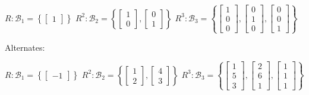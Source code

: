 \documentclass[10pt,letterpaper,final]{report}
\begin{document}
$R: \mathcal{B}_1 = \left\{\begin{bmatrix}
    1
  \end{bmatrix}\right\}$
\medskip
$R^2: \mathcal{B}_2 = \left\{\begin{bmatrix}
    1 \\
    0
  \end{bmatrix}, \begin{bmatrix}
    0 \\
    1
  \end{bmatrix}\right\}$
\medskip
$R^3: \mathcal{B}_3 = \left\{\begin{bmatrix}
    1 \\
    0 \\
    0
  \end{bmatrix}, \begin{bmatrix}
    0 \\
    1 \\
    0
  \end{bmatrix},\begin{bmatrix}
    0 \\
    0 \\
    1
  \end{bmatrix}\right\}$

Alternates:

$R: \mathcal{B}_1 = \left\{\begin{bmatrix}
    -1
  \end{bmatrix}\right\}$
\medskip
$R^2: \mathcal{B}_2 = \left\{\begin{bmatrix}
    1 \\
    2
  \end{bmatrix}, \begin{bmatrix}
    4 \\
    3
  \end{bmatrix}\right\}$
\medskip
$R^3: \mathcal{B}_3 = \left\{\begin{bmatrix}
    1 \\
    5 \\
    3
  \end{bmatrix}, \begin{bmatrix}
    2 \\
    6 \\
    1
  \end{bmatrix},\begin{bmatrix}
    1 \\
    1 \\
    1
  \end{bmatrix}\right\}$
\end{document}
